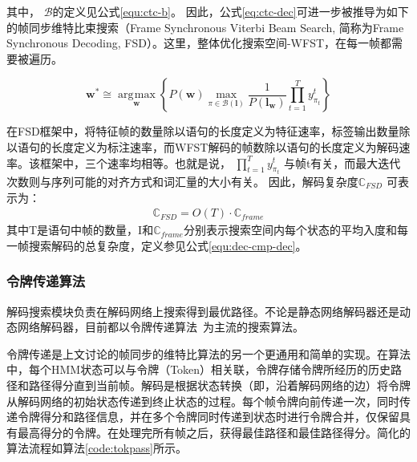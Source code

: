 其中， $\mathcal{B}$的定义见公式\ref{equ:ctc-b}。
因此，公式\ref{eq:ctc-dec}可进一步被推导为如下的帧同步维特比束搜索（Frame Synchronous Viterbi Beam Search, 简称为Frame Synchronous Decoding, FSD）。这里，整体优化搜索空间-WFST，在每一帧都需要被遍历。

              
    \begin{equation} \label{eq:viterbi-app}
       \mathbf{w}^* \cong\mathop{\arg\!\max}\limits_\mathbf{w}
       \left\{\!
       P(\mathbf{w})
       \mathop{\max}\limits
       _{\!\!\pi\in\mathcal{B}(\mathbf{l})}
       \frac{1}{P(\mathbf{l}_\mathbf{w})}
       \prod_{t=1}^{T}{y^{t}_{\pi_{t}}}
      \right \}
    \end{equation}

  
在FSD框架中，将特征帧的数量除以语句的长度定义为特征速率，标签输出数量除以语句的长度定义为标注速率，而WFST解码的帧数除以语句的长度定义为解码速率。该框架中，三个速率均相等。也就是说， $\prod_{t=1}^{T} y^{t}_{\pi_{t}}$  与帧t有关，而最大迭代次数则与序列可能的对齐方式和词汇量的大小有关。 因此，解码复杂度$\mathbb{C}_{FSD}$ 可表示为：
  \begin{equation}
\label{equ:complex-fsd}
\begin{split}
\mathbb{C}_{FSD} =  O(T) \cdot \mathbb{C}_{frame}
\end{split}
\end{equation}
其中T是语句中帧的数量，I和$\mathbb{C}_{frame}$分别表示搜索空间内每个状态的平均入度和每一帧搜索解码的总复杂度，定义参见公式\ref{equ:dec-cmp-dec}。

\subsubsection{令牌传递算法}

解码搜索模块负责在解码网络上搜索得到最优路径。不论是静态网络解码器还是动态网络解码器，目前都以令牌传递算法~\cite{young1989token}为主流的搜索算法。

令牌传递是上文讨论的帧同步的维特比算法的另一个更通用和简单的实现。在算法中，每个HMM状态可以与令牌（Token）相关联，令牌存储令牌所经历的历史路径和路径得分直到当前帧。解码是根据状态转换（即，沿着解码网络的边）将令牌从解码网络的初始状态传递到终止状态的过程。每个帧令牌向前传递一次，同时传递令牌得分和路径信息，并在多个令牌同时传递到状态时进行令牌合并，仅保留具有最高得分的令牌。在处理完所有帧之后，获得最佳路径和最佳路径得分。简化的算法流程如算法\ref{code:tokpass}所示。


